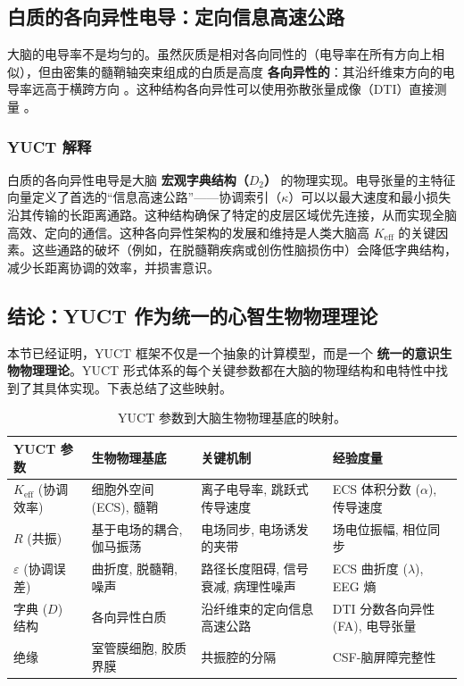 \documentclass[12pt,a4paper]{article}
\begin{document}
	\subsection{白质的各向异性电导：定向信息高速公路}
	
	大脑的电导率不是均匀的。虽然灰质是相对各向同性的（电导率在所有方向上相似），但由密集的髓鞘轴突束组成的白质是高度 \textbf{各向异性的}：其沿纤维束方向的电导率远高于横跨方向 \cite{Tuch2001}。这种结构各向异性可以使用弥散张量成像（DTI）直接测量 \cite{Wu2018}。
	
	\subsubsection*{YUCT 解释}
	白质的各向异性电导是大脑 \textbf{宏观字典结构（\(D_2\)）} 的物理实现。电导张量的主特征向量定义了首选的“信息高速公路”——协调索引（\(\kappa\)）可以以最大速度和最小损失沿其传输的长距离通路。这种结构确保了特定的皮层区域优先连接，从而实现全脑高效、定向的通信。这种各向异性架构的发展和维持是人类大脑高 \(K_{\mathrm{eff}}\) 的关键因素。这些通路的破坏（例如，在脱髓鞘疾病或创伤性脑损伤中）会降低字典结构，减少长距离协调的效率，并损害意识。
	
	\subsection{结论：YUCT 作为统一的心智生物物理理论}
	
	本节已经证明，YUCT 框架不仅是一个抽象的计算模型，而是一个 \textbf{统一的意识生物物理理论}。YUCT 形式体系的每个关键参数都在大脑的物理结构和电特性中找到了其具体实现。下表总结了这些映射。
	
	\begin{table}[H]
		\centering
		\caption{YUCT 参数到大脑生物物理基底的映射。}
		\label{tab:biophysical-mapping}
		\small
		\begin{tabular}{p{3cm} p{4cm} p{5cm} p{3cm}}
			\toprule
			\textbf{YUCT 参数} & \textbf{生物物理基底} & \textbf{关键机制} & \textbf{经验度量} \\
			\midrule
			\(K_{\mathrm{eff}}\) (协调效率) & 细胞外空间 (ECS), 髓鞘 & 离子电导率, 跳跃式传导速度 & ECS 体积分数 (\(\alpha\)), 传导速度 \\
			\(R\) (共振) & 基于电场的耦合, 伽马振荡 & 电场同步, 电场诱发的夹带 & 场电位振幅, 相位同步 \\
			\(\varepsilon\) (协调误差) & 曲折度, 脱髓鞘, 噪声 & 路径长度阻碍, 信号衰减, 病理性噪声 & ECS 曲折度 (\(\lambda\)), EEG 熵 \\
			字典 (\(D\)) 结构 & 各向异性白质 & 沿纤维束的定向信息高速公路 & DTI 分数各向异性 (FA), 电导张量 \\
			绝缘 & 室管膜细胞, 胶质界膜 & 共振腔的分隔 & CSF-脑屏障完整性 \\
			\bottomrule
		\end{tabular}
	\end{table}
	
\end{document}
